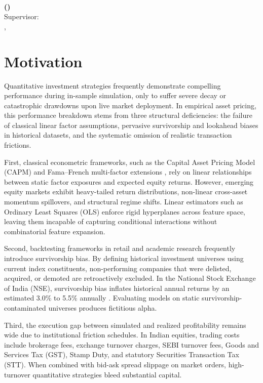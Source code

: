\begin{center}
{\huge\textbf{\ttitle}}\\[0.4cm]
{\large\textbf{\authorname{} (\rn)}}\\[0.2cm]
{\large Supervisor: \textbf{\supname}}\\[0.2cm]
{\large \deptname{}, \univname{}}
\end{center}
\vspace{0.8cm}

\section{Motivation}
\label{sec:motivation}
Quantitative investment strategies frequently demonstrate compelling performance during in-sample simulation, only to suffer severe decay or catastrophic drawdowns upon live market deployment. In empirical asset pricing, this performance breakdown stems from three structural deficiencies: the failure of classical linear factor assumptions, pervasive survivorship and lookahead biases in historical datasets, and the systematic omission of realistic transaction frictions.

First, classical econometric frameworks, such as the Capital Asset Pricing Model (CAPM) and Fama--French multi-factor extensions \cite{fama1993common, fama2015five}, rely on linear relationships between static factor exposures and expected equity returns. However, emerging equity markets exhibit heavy-tailed return distributions, non-linear cross-asset momentum spillovers, and structural regime shifts. Linear estimators such as Ordinary Least Squares (OLS) enforce rigid hyperplanes across feature space, leaving them incapable of capturing conditional interactions without combinatorial feature expansion.

Second, backtesting frameworks in retail and academic research frequently introduce survivorship bias. By defining historical investment universes using current index constituents, non-performing companies that were delisted, acquired, or demoted are retroactively excluded. In the National Stock Exchange of India (NSE), survivorship bias inflates historical annual returns by an estimated 3.0\% to 5.5\% annually \cite{lopezdeprado2018advances}. Evaluating models on static survivorship-contaminated universes produces fictitious alpha.

Third, the execution gap between simulated and realized profitability remains wide due to institutional friction schedules. In Indian equities, trading costs include brokerage fees, exchange turnover charges, SEBI turnover fees, Goods and Services Tax (GST), Stamp Duty, and statutory Securities Transaction Tax (STT). When combined with bid-ask spread slippage on market orders, high-turnover quantitative strategies bleed substantial capital. 

